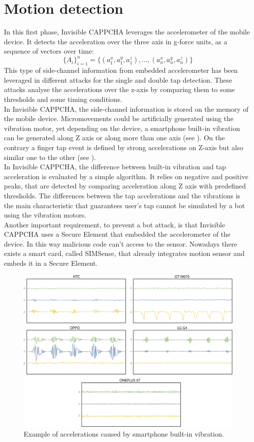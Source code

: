 \section{Motion detection}
In this first phase, Invisible CAPPCHA leverages the accelerometer of the mobile device. It detects the acceleration over the three axis in g-force units, as a sequence of vectors over time:
$$\{ A_i\}_{i=1}^{n} = \{ (a_1^x, a_1^y, a_1^z), ..., (a_n^x, a_n^y, a_n^z)\}$$
This type of side-channel information from embedded accelerometer has been leveraged in different attacks for the single and double tap detection. These attacks analyse the accelerations over the z-axis by comparing them to some thresholds and some timing conditions.\\
In Invisible CAPPCHA, the side-channel information is stored on the memory of the mobile device. Micromovements could be artificially generated using the vibration motor, yet depending on the device, a smartphone built-in vibration can be generated along Z axis or along more than one axis (see ). On the contrary a finger tap event is defined by strong accelerations on Z-axis but also similar one to the other (see ).\\
In Invisible CAPPCHA, the difference between built-in vibration and tap acceleration is evaluated by a simple algorithm. It relies on negative and positive peaks, that are detected by comparing acceleration along Z axis with predefined thresholds. The differences between the tap accelerations and the vibrations is the main characteristic that guarantees user's tap cannot be simulated by a bot using the vibration motors.\\
Another important requirement, to prevent a bot attack, is that Invisible CAPPCHA uses a Secure Element that embedded the accelerometer of the device. In this way malicious code can't access to the sensor. Nowadays there exists a smart card, called SIMSense, that already integrates motion sensor and embeds it in a Secure Element.\\
\begin{figure}[h]
     \centering
     \includegraphics[width=.8\linewidth]{Images/InvisibleCAPPCHA/vibration}
     \caption{\footnotesize{Example of accelerations caused by smartphone built-in vibration.}}\label{inv:vibration}
\end{figure}
